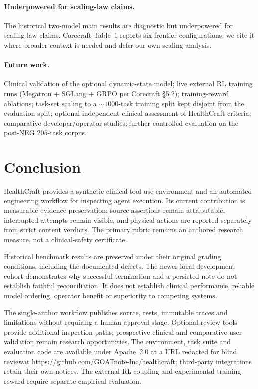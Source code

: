 \paragraph{Underpowered for scaling-law claims.}
The historical two-model main results are diagnostic but
underpowered for scaling-law claims. Corecraft Table~1 reports six
frontier configurations; we cite it where broader context is needed
and defer our own scaling analysis.

\paragraph{Future work.}
Clinical validation of the optional dynamic-state model; live external
RL training runs (Megatron + SGLang + GRPO per Corecraft \S5.2);
training-reward ablations; task-set scaling to a
$\sim\!1000$-task training split kept disjoint from the
evaluation split; optional independent clinical assessment of HealthCraft
criteria; comparative developer/operator studies; further controlled evaluation on the
post-NEG $205$-task corpus.

\section{Conclusion}
\label{sec:conclusion}

HealthCraft provides a synthetic clinical tool-use environment and an
automated engineering workflow for inspecting agent execution. Its current
contribution is measurable evidence preservation: source assertions remain
attributable, interrupted attempts remain visible, and physical actions are
reported separately from strict content verdicts. The primary rubric remains
an authored research measure, not a clinical-safety certificate.

Historical benchmark results are preserved under their original grading
conditions, including the documented defects. The newer local development
cohort demonstrates why successful termination and a persisted note do not
establish faithful reconciliation. It does not establish clinical performance,
reliable model ordering, operator benefit or superiority to competing systems.

The single-author workflow publishes source, tests, immutable traces and
limitations without requiring a human approval stage. Optional review tools
provide additional inspection paths; prospective clinical and comparative
user validation remain research opportunities. The environment, task suite
and evaluation code are available under Apache~2.0
\ifanon at a URL redacted for blind review\else at
\url{https://github.com/GOATnote-Inc/healthcraft}\fi;
third-party integrations retain their own notices. The external RL coupling
and experimental training reward require separate empirical evaluation.

